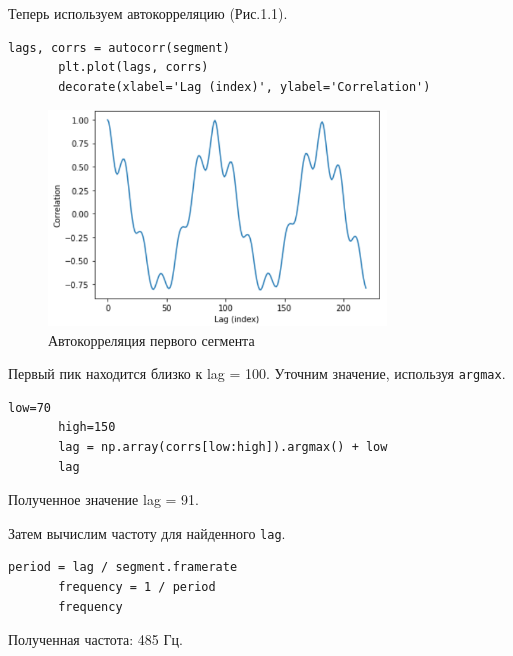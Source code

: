 \documentclass[a4paper,12pt]{report}
\begin{document}
    Теперь используем автокорреляцию (Рис.1.1).
\begin{lstlisting}[caption=Использование автокорреляцию]
       lags, corrs = autocorr(segment)
       plt.plot(lags, corrs)
       decorate(xlabel='Lag (index)', ylabel='Correlation')
\end{lstlisting}
\begin{figure}[H]
        \centering
        \includegraphics[width=0.8\textwidth]{fig1-1.PNG}
        \caption{Автокорреляция первого сегмента}
        \label{fig:fig1-1}
\end{figure}   
   
    Первый пик находится близко к lag = 100. Уточним значение, используя \texttt{argmax}.
\begin{lstlisting}[caption=Уточнение значения lag]
       low=70
       high=150
       lag = np.array(corrs[low:high]).argmax() + low
       lag
\end{lstlisting}
    
    Полученное значение lag = 91.
    
    Затем вычислим частоту для найденного \texttt{lag}.
\begin{lstlisting}[caption=Нахождение частоты]
       period = lag / segment.framerate
       frequency = 1 / period
       frequency
\end{lstlisting} 
    
     Полученная частота: 485 Гц. 
     
\end{document}
